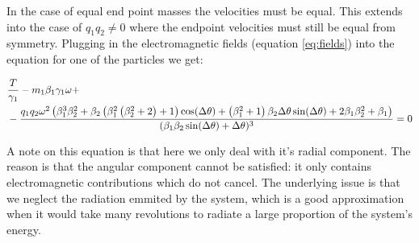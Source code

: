 \documentclass[11pt,a4paper]{article}
\begin{document}

In the case of equal end point masses the velocities must be equal. This extends into the case of $q_1q_2\neq0$ where the endpoint velocities must still be equal from symmetry. Plugging in the electromagnetic fields (equation \ref{eq:fields}) into the equation for one of the particles we get:

\begin{align}
\label{eq:endpoint}
&\frac{T}{\gamma_1}-m_1\beta_1\gamma_1\omega+\notag\\
&-\frac{q_1q_2\omega^2\left(\beta_1^3 \beta_2^2+\beta_2 \left(\beta_1^2 \left(\beta_2^2+2\right)+1\right) \cos (\Delta \theta)+\left(\beta_1^2+1\right) \beta_2 \Delta \theta  \sin (\Delta \theta )+2 \beta_1 \beta_2^2+\beta_1\right)}{(\beta_1 \beta_2 \sin (\Delta \theta )+\Delta \theta )^3}=0
\end{align}

A note on this equation is that here we only deal with it's radial component. The reason is that the angular component cannot be satisfied: it only contains electromagnetic contributions which do not cancel. The underlying issue is that we neglect the radiation emmited by the system, which is a good approximation when it would take many revolutions to radiate a large proportion of the system's energy.
\end{document}
